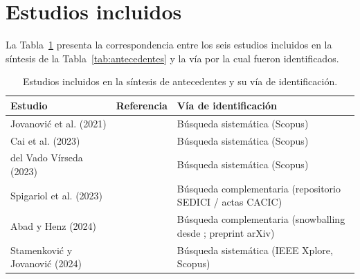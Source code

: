 \section{Estudios incluidos}

La Tabla~\ref{tab:estudios-incluidos} presenta la correspondencia entre los seis estudios incluidos en la síntesis de la Tabla~\ref{tab:antecedentes} y la vía por la cual fueron identificados.

\begin{table}[H]
\centering
\footnotesize
\begin{tabular}{|>{\raggedright\arraybackslash}p{3.2cm}|>{\raggedright\arraybackslash}p{4.3cm}|>{\raggedright\arraybackslash}p{4.7cm}|}
\hline
\textbf{Estudio} & \textbf{Referencia} & \textbf{Vía de identificación} \\
\hline
Jovanović et al. (2021) & \cite{jovanovic2021comvis} & Búsqueda sistemática (Scopus) \\
\hline
Cai et al. (2023) & \cite{Cai2023VisualizingEnvironments} & Búsqueda sistemática (Scopus) \\
\hline
del Vado Vírseda (2023) & \cite{delvado2023itt} & Búsqueda sistemática (Scopus) \\
\hline
Spigariol et al. (2023) & \cite{Spigariol2023Aprendiendo} & Búsqueda complementaria (repositorio SEDICI / actas CACIC) \\
\hline
Abad y Henz (2024) & \cite{Abad2024BeyondSICP} & Búsqueda complementaria (snowballing desde \cite{Cai2023VisualizingEnvironments}; preprint arXiv) \\
\hline
Stamenković y Jovanović (2024) & \cite{Stamenkovic2024AWE} & Búsqueda sistemática (IEEE Xplore, Scopus) \\
\hline
\end{tabular}
\caption{Estudios incluidos en la síntesis de antecedentes y su vía de identificación.}
\label{tab:estudios-incluidos}
\end{table}
